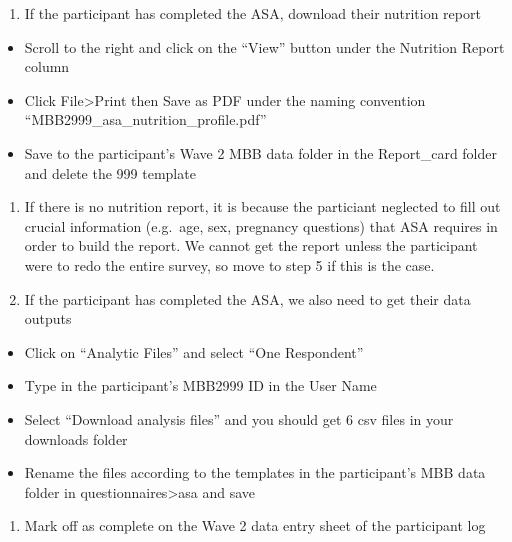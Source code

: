 \documentclass[]{book}
\providecommand{\tightlist}{%
  \setlength{\itemsep}{0pt}\setlength{\parskip}{0pt}}
\begin{document}
\begin{enumerate}
\def\labelenumi{\arabic{enumi}.}
\setcounter{enumi}{2}
\tightlist
\item
  If the participant has completed the ASA, download their nutrition report
\end{enumerate}

\begin{itemize}
\tightlist
\item
  Scroll to the right and click on the ``View'' button under the Nutrition Report column
\item
  Click File\textgreater{}Print then Save as PDF under the naming convention ``MBB2999\_asa\_nutrition\_profile.pdf''
\item
  Save to the participant's Wave 2 MBB data folder in the Report\_card folder and delete the 999 template
\end{itemize}

\begin{enumerate}
\def\labelenumi{\arabic{enumi}.}
\setcounter{enumi}{3}
\tightlist
\item
  If there is no nutrition report, it is because the particiant neglected to fill out crucial information (e.g.~age, sex, pregnancy questions) that ASA requires in order to build the report. We cannot get the report unless the participant were to redo the entire survey, so move to step 5 if this is the case.
\item
  If the participant has completed the ASA, we also need to get their data outputs
\end{enumerate}

\begin{itemize}
\tightlist
\item
  Click on ``Analytic Files'' and select ``One Respondent''
\item
  Type in the participant's MBB2999 ID in the User Name
\item
  Select ``Download analysis files'' and you should get 6 csv files in your downloads folder
\item
  Rename the files according to the templates in the participant's MBB data folder in questionnaires\textgreater{}asa and save
\end{itemize}

\begin{enumerate}
\def\labelenumi{\arabic{enumi}.}
\setcounter{enumi}{5}
\tightlist
\item
  Mark off as complete on the Wave 2 data entry sheet of the participant log
\end{enumerate}
\end{document}

